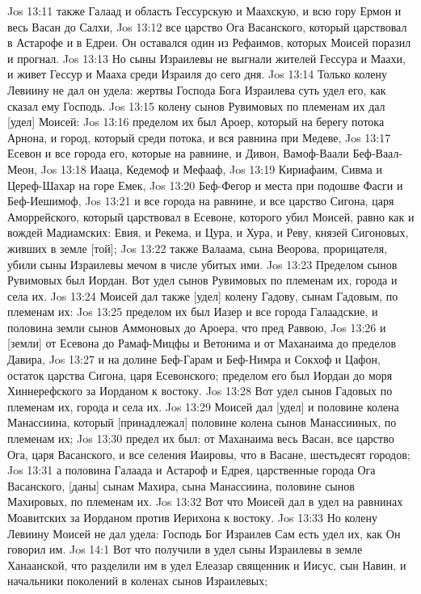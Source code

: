 Jos 13:11  также Галаад и область Гессурскую и Маахскую, и всю гору Ермон и весь Васан до Салхи,
Jos 13:12  все царство Ога Васанского, который царствовал в Астарофе и в Едреи. Он оставался один из Рефаимов, которых Моисей поразил и прогнал.
Jos 13:13  Но сыны Израилевы не выгнали жителей Гессура и Маахи, и живет Гессур и Мааха среди Израиля до сего дня.
Jos 13:14  Только колену Левиину не дал он удела: жертвы Господа Бога Израилева суть удел его, как сказал ему Господь.
Jos 13:15  колену сынов Рувимовых по племенам их дал [удел] Моисей:
Jos 13:16  пределом их был Ароер, который на берегу потока Арнона, и город, который среди потока, и вся равнина при Медеве,
Jos 13:17  Есевон и все города его, которые на равнине, и Дивон, Вамоф-Ваали Беф-Ваал-Меон,
Jos 13:18  Иааца, Кедемоф и Мефааф,
Jos 13:19  Кириафаим, Сивма и Цереф-Шахар на горе Емек,
Jos 13:20  Беф-Фегор и места при подошве Фасги и Беф-Иешимоф,
Jos 13:21  и все города на равнине, и все царство Сигона, царя Аморрейского, который царствовал в Есевоне, которого убил Моисей, равно как и вождей Мадиамских: Евия, и Рекема, и Цура, и Хура, и Реву, князей Сигоновых, живших в земле [той];
Jos 13:22  также Валаама, сына Веорова, прорицателя, убили сыны Израилевы мечом в числе убитых ими.
Jos 13:23  Пределом сынов Рувимовых был Иордан. Вот удел сынов Рувимовых по племенам их, города и села их.
Jos 13:24  Моисей дал также [удел] колену Гадову, сынам Гадовым, по племенам их:
Jos 13:25  пределом их был Иазер и все города Галаадские, и половина земли сынов Аммоновых до Ароера, что пред Раввою,
Jos 13:26  и [земли] от Есевона до Рамаф-Мицфы и Ветонима и от Маханаима до пределов Давира,
Jos 13:27  и на долине Беф-Гарам и Беф-Нимра и Сокхоф и Цафон, остаток царства Сигона, царя Есевонского; пределом его был Иордан до моря Хиннерефского за Иорданом к востоку.
Jos 13:28  Вот удел сынов Гадовых по племенам их, города и села их.
Jos 13:29  Моисей дал [удел] и половине колена Манассиина, который [принадлежал] половине колена сынов Манассииных, по племенам их;
Jos 13:30  предел их был: от Маханаима весь Васан, все царство Ога, царя Васанского, и все селения Иаировы, что в Васане, шестьдесят городов;
Jos 13:31  а половина Галаада и Астароф и Едрея, царственные города Ога Васанского, [даны] сынам Махира, сына Манассиина, половине сынов Махировых, по племенам их.
Jos 13:32  Вот что Моисей дал в удел на равнинах Моавитских за Иорданом против Иерихона к востоку.
Jos 13:33  Но колену Левиину Моисей не дал удела: Господь Бог Израилев Сам есть удел их, как Он говорил им.
Jos 14:1  Вот что получили в удел сыны Израилевы в земле Ханаанской, что разделили им в удел Елеазар священник и Иисус, сын Навин, и начальники поколений в коленах сынов Израилевых;
